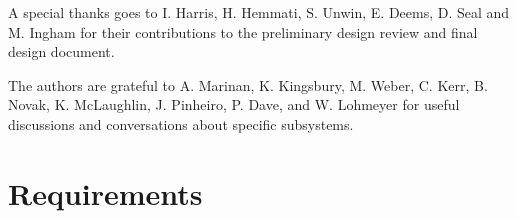 \documentclass[12pt]{article}
\begin{document}
A special thanks goes to I. Harris, H. Hemmati, S. Unwin, E. Deems, D. Seal and M. Ingham for their contributions to the preliminary design review and final design document.

The authors are grateful to A. Marinan, K. Kingsbury, M. Weber, C. Kerr, B. Novak, K. McLaughlin, J. Pinheiro, P. Dave, and W. Lohmeyer for useful discussions and conversations about specific subsystems.	
	
\FloatBarrier
\newpage
\appendix
\section{Requirements} \label{app:requirements}



\newpage
\end{document}
